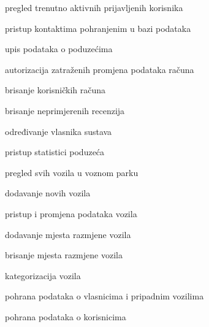 \begin{packed_enum}
\begin{packed_enum}
				\end{packed_enum}
				
					\item  {}
				
				\begin{packed_enum}
					
					\item pregled trenutno aktivnih prijavljenih korisnika
					\item pristup kontaktima pohranjenim u bazi podataka
					\item upis podataka o poduzećima
					\item autorizacija zatraženih promjena podataka računa
					\item brisanje korisničkih računa
					\item brisanje neprimjerenih recenzija
					\item određivanje vlasnika sustava
					
				\end{packed_enum}
				
					\item  {}
				
				\begin{packed_enum}
					
					\item pristup statistici poduzeća
					\item pregled svih vozila u voznom parku
					\item dodavanje novih vozila
					\item pristup i promjena podataka vozila
					\item dodavanje mjesta razmjene vozila
					\item brisanje mjesta razmjene vozila
					\item kategorizacija vozila
					
				\end{packed_enum}
			
				\item  {}
				
				\begin{packed_enum}
					
					\item pohrana podataka o vlasnicima i pripadnim vozilima
					\item pohrana podataka o korisnicima 
					
				\end{packed_enum}
			\end{packed_enum}
			
